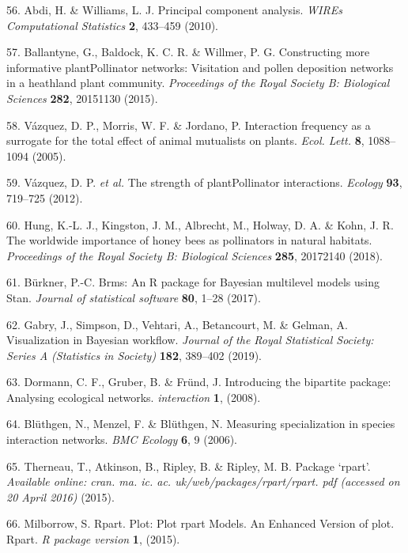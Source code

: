 \documentclass[
  12pt,
  a4paper,
]{article}
\begin{document}
\leavevmode\hypertarget{ref-abdi2010}{}%
56. Abdi, H. \& Williams, L. J. Principal component analysis. \emph{WIREs Computational Statistics} \textbf{2}, 433--459 (2010).

\leavevmode\hypertarget{ref-ballantyne2015}{}%
57. Ballantyne, G., Baldock, K. C. R. \& Willmer, P. G. Constructing more informative plantPollinator networks: Visitation and pollen deposition networks in a heathland plant community. \emph{Proceedings of the Royal Society B: Biological Sciences} \textbf{282}, 20151130 (2015).

\leavevmode\hypertarget{ref-vazquez2005}{}%
58. Vázquez, D. P., Morris, W. F. \& Jordano, P. Interaction frequency as a surrogate for the total effect of animal mutualists on plants. \emph{Ecol. Lett.} \textbf{8}, 1088--1094 (2005).

\leavevmode\hypertarget{ref-vazquez2012}{}%
59. Vázquez, D. P. \emph{et al.} The strength of plantPollinator interactions. \emph{Ecology} \textbf{93}, 719--725 (2012).

\leavevmode\hypertarget{ref-hung2018}{}%
60. Hung, K.-L. J., Kingston, J. M., Albrecht, M., Holway, D. A. \& Kohn, J. R. The worldwide importance of honey bees as pollinators in natural habitats. \emph{Proceedings of the Royal Society B: Biological Sciences} \textbf{285}, 20172140 (2018).

\leavevmode\hypertarget{ref-burkner2017}{}%
61. Bürkner, P.-C. Brms: An R package for Bayesian multilevel models using Stan. \emph{Journal of statistical software} \textbf{80}, 1--28 (2017).

\leavevmode\hypertarget{ref-gabry2019}{}%
62. Gabry, J., Simpson, D., Vehtari, A., Betancourt, M. \& Gelman, A. Visualization in Bayesian workflow. \emph{Journal of the Royal Statistical Society: Series A (Statistics in Society)} \textbf{182}, 389--402 (2019).

\leavevmode\hypertarget{ref-dormann2008}{}%
63. Dormann, C. F., Gruber, B. \& Fründ, J. Introducing the bipartite package: Analysing ecological networks. \emph{interaction} \textbf{1}, (2008).

\leavevmode\hypertarget{ref-bluthgen2006}{}%
64. Blüthgen, N., Menzel, F. \& Blüthgen, N. Measuring specialization in species interaction networks. \emph{BMC Ecology} \textbf{6}, 9 (2006).

\leavevmode\hypertarget{ref-therneau2015}{}%
65. Therneau, T., Atkinson, B., Ripley, B. \& Ripley, M. B. Package `rpart'. \emph{Available online: cran. ma. ic. ac. uk/web/packages/rpart/rpart. pdf (accessed on 20 April 2016)} (2015).

\leavevmode\hypertarget{ref-milborrow2015}{}%
66. Milborrow, S. Rpart. Plot: Plot rpart Models. An Enhanced Version of plot. Rpart. \emph{R package version} \textbf{1}, (2015).
\end{document}
